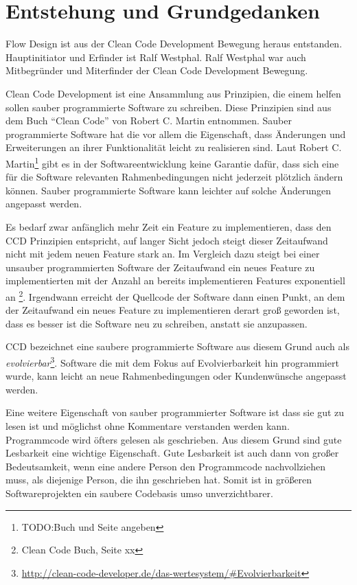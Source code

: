 \chapter{Entstehung und Grundgedanken}


Flow Design ist aus der Clean Code Development Bewegung heraus entstanden. Hauptinitiator und Erfinder ist Ralf Westphal.
Ralf Westphal war auch Mitbegründer und Miterfinder der Clean Code Development Bewegung.


Clean Code Development ist eine Ansammlung aus Prinzipien, die einem helfen
sollen sauber programmierte Software zu schreiben. Diese Prinzipien sind aus dem Buch \enquote{Clean Code} von Robert C. Martin entnommen. Sauber programmierte Software hat 
die vor allem die Eigenschaft, dass Änderungen und Erweiterungen an ihrer Funktionalität
leicht zu realisieren sind. Laut Robert C. Martin\footnote{TODO:Buch und Seite angeben} gibt es in der Softwareentwicklung
keine Garantie dafür, dass sich eine für die Software relevanten
Rahmenbedingungen nicht jederzeit plötzlich ändern können. Sauber programmierte
Software kann leichter auf solche Änderungen angepasst werden. 

Es bedarf zwar anfänglich mehr Zeit ein Feature zu implementieren, dass den CCD Prinzipien entspricht, auf langer
Sicht jedoch steigt dieser Zeitaufwand nicht mit jedem neuen Feature stark
an. Im Vergleich dazu steigt bei einer unsauber programmierten Software der Zeitaufwand ein neues
Feature zu implementierten mit der Anzahl an bereits implementieren Features
exponentiell an \footnote{Clean Code Buch, Seite xx}. Irgendwann erreicht der Quellcode der Software dann einen Punkt, an
dem der Zeitaufwand ein neues Feature zu implementieren derart groß geworden ist, dass es besser ist die Software neu zu schreiben, anstatt sie anzupassen.

CCD bezeichnet eine saubere programmierte Software aus diesem Grund auch als \emph{evolvierbar}\footnote{\url{http://clean-code-developer.de/das-wertesystem/\#Evolvierbarkeit}}.
Software die mit dem Fokus auf Evolvierbarkeit hin programmiert wurde,
kann leicht an neue Rahmenbedingungen oder Kundenwünsche angepasst werden.


Eine weitere Eigenschaft von sauber programmierter Software ist dass sie gut zu
lesen ist und möglichst ohne Kommentare verstanden werden kann.
Programmcode wird öfters gelesen als geschrieben. Aus diesem Grund sind gute
Lesbarkeit eine wichtige Eigenschaft. Gute Lesbarkeit ist auch dann von großer
Bedeutsamkeit, wenn eine andere Person den Programmcode nachvollziehen muss, als diejenige Person, die ihn geschrieben hat.
Somit ist in größeren Softwareprojekten ein saubere Codebasis umso unverzichtbarer.

